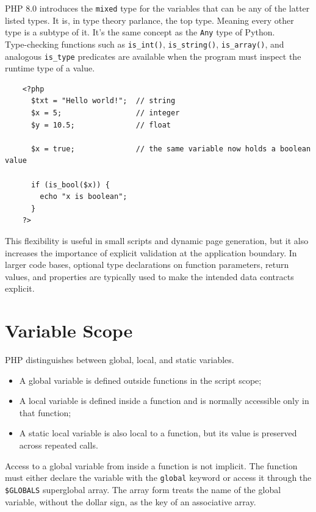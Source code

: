 \documentclass{scrbook}
\begin{document}
	PHP 8.0 introduces the \texttt{mixed} type for the variables that can be any of the latter listed types. It is, in type theory parlance, the top type. Meaning every other type is a subtype of it. It's the same concept as the \texttt{Any} type of Python.\\
	
	Type-checking functions such as \texttt{is\_int()}, \texttt{is\_string()}, \texttt{is\_array()}, and analogous \texttt{is\_type} predicates are available when the program must inspect the runtime type of a value.
	
	\begin{lstlisting}
	<?php
	  $txt = "Hello world!";  // string
	  $x = 5;                 // integer
	  $y = 10.5;              // float
		
	  $x = true;              // the same variable now holds a boolean value
		
	  if (is_bool($x)) {
		echo "x is boolean";
	  }
	?>
	\end{lstlisting}
	
	This flexibility is useful in small scripts and dynamic page generation, but it also increases the importance of explicit validation at the application boundary. In larger code bases, optional type declarations on function parameters, return values, and properties are typically used to make the intended data contracts explicit.
	
	\section{Variable Scope}
	
	PHP distinguishes between global, local, and static variables.
	\begin{itemize}
		\item A global variable is defined outside functions in the script scope;
		\item A local variable is defined inside a function and is normally accessible only in that function;
		\item A static local variable is also local to a function, but its value is preserved across repeated calls.
	\end{itemize}
	
	Access to a global variable from inside a function is not implicit. The function must either declare the variable with the \texttt{global} keyword or access it through the \texttt{\$GLOBALS} superglobal array. The array form treats the name of the global variable, without the dollar sign, as the key of an associative array.
	
\end{document}
